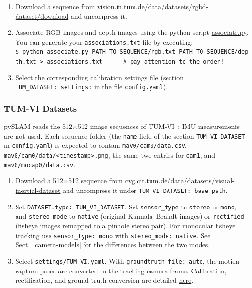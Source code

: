 \documentclass{article}
\providecommand{\tightlist}{%
  \setlength{\itemsep}{0pt}\setlength{\parskip}{0pt}}
\begin{document}
\begin{enumerate}
\def\labelenumi{\arabic{enumi}.}
\tightlist
\item
  Download a sequence from
  \href{http://vision.in.tum.de/data/datasets/rgbd-dataset/download}{vision.in.tum.de/data/datasets/rgbd-dataset/download} and
  uncompress it.
\item
  Associate RGB images and depth images using the python script
  \href{http://vision.in.tum.de/data/datasets/rgbd-dataset/tools}{associate.py}.
  You can generate your \texttt{associations.txt} file by executing:\\
  \texttt{\$\ python\ associate.py\ PATH\_TO\_SEQUENCE/rgb.txt\ PATH\_TO\_SEQUENCE/depth.txt\ \textgreater{}\ associations.txt\ \ \ \ \ \ \#\ pay\ attention\ to\ the\ order!}
\item
  Select the corresponding calibration settings file (section
  \texttt{TUM\_DATASET:\ settings:} in the file \texttt{config.yaml}).
\end{enumerate}

\hypertarget{tum-vi-datasets}{%
\subsubsection{TUM-VI Datasets}\label{tum-vi-datasets}}

pySLAM reads the 512$\times$512 image sequences of TUM-VI~\cite{schubert2018tumvi}; IMU measurements are not used. Each sequence folder (the \texttt{name} field of the section \texttt{TUM\_VI\_DATASET} in \texttt{config.yaml}) is expected to contain \texttt{mav0/cam0/data.csv}, \texttt{mav0/cam0/data/<timestamp>.png}, the same two entries for \texttt{cam1}, and \texttt{mav0/mocap0/data.csv}.

\begin{enumerate}
\def\labelenumi{\arabic{enumi}.}
\tightlist
\item
  Download a 512$\times$512 sequence from
  \href{https://cvg.cit.tum.de/data/datasets/visual-inertial-dataset}{cvg.cit.tum.de/data/datasets/visual-inertial-dataset}
  and uncompress it under \texttt{TUM\_VI\_DATASET:\ base\_path}.
\item
  Set \texttt{DATASET.type:\ TUM\_VI\_DATASET}. Set \texttt{sensor\_type} to \texttt{stereo} or \texttt{mono}, and \texttt{stereo\_mode} to \texttt{native} (original Kannala--Brandt images) or \texttt{rectified} (fisheye images remapped to a pinhole stereo pair). For monocular fisheye tracking use \texttt{sensor\_type:\ mono} with \texttt{stereo\_mode:\ native}. See Sect.~\ref{camera-models} for the differences between the two modes.
\item
  Select \texttt{settings/TUM\_VI.yaml}. With \texttt{groundtruth\_file:\ auto}, the motion-capture poses are converted to the tracking camera frame. Calibration, rectification, and ground-truth conversion are detailed \href{https://github.com/luigifreda/pyslam/blob/master/docs/tum-vi.md}{here}.
\end{enumerate}
\end{document}
